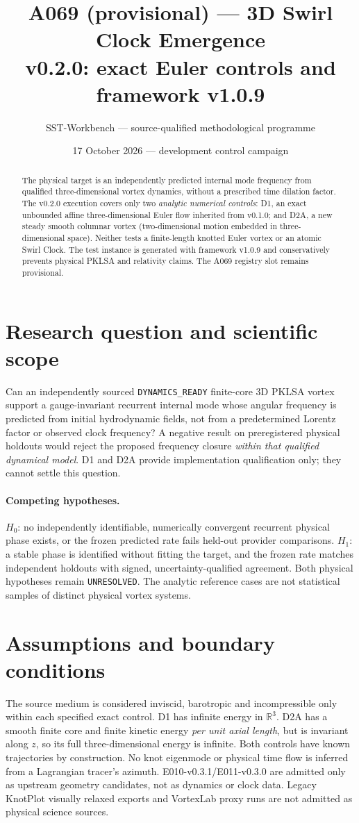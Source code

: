 \documentclass[10pt,a4paper]{article}
\title{A069 (provisional) --- 3D Swirl Clock Emergence\\\large v0.2.0: exact Euler controls and framework v1.0.9}
\author{SST-Workbench --- source-qualified methodological programme}
\date{17 October 2026 --- development control campaign}
\newcommand{\unresolved}{\texttt{UNRESOLVED}}
\begin{document}
\maketitle
\begin{abstract}
The physical target is an independently predicted internal mode frequency from qualified
three-dimensional vortex dynamics, without a prescribed time dilation factor.
The v0.2.0 execution covers only two \emph{analytic numerical controls}: D1, an exact
unbounded affine three-dimensional Euler flow inherited from v0.1.0; and D2A,
a new steady smooth columnar vortex (two-dimensional motion embedded in three-dimensional
space). Neither tests a finite-length knotted Euler vortex or an atomic Swirl Clock.
The test instance is generated with framework v1.0.9 and conservatively prevents
physical PKLSA and relativity claims. The A069 registry slot remains provisional.
\end{abstract}
\section{Research question and scientific scope}
Can an independently sourced \texttt{DYNAMICS\_READY} finite-core 3D PKLSA vortex
support a gauge-invariant recurrent internal mode whose angular frequency is predicted
from initial hydrodynamic fields, not from a predetermined Lorentz factor or observed
clock frequency? A negative result on preregistered physical holdouts would reject
the proposed frequency closure \emph{within that qualified dynamical model}. D1 and D2A
provide implementation qualification only; they cannot settle this question.
\paragraph{Competing hypotheses.}
$H_0$: no independently identifiable, numerically convergent recurrent physical
phase exists, or the frozen predicted rate fails held-out provider comparisons.
$H_1$: a stable phase is identified without fitting the target, and the frozen
rate matches independent holdouts with signed, uncertainty-qualified agreement.
Both physical hypotheses remain \unresolved. The analytic reference cases are
not statistical samples of distinct physical vortex systems.
\section{Assumptions and boundary conditions}
The source medium is considered inviscid, barotropic and incompressible only
within each specified exact control. D1 has infinite energy in $\mathbb R^3$.
D2A has a smooth finite core and finite kinetic energy \emph{per unit axial length},
but is invariant along $z$, so its full three-dimensional energy is infinite.
Both controls have known trajectories by construction. No knot eigenmode or
physical time flow is inferred from a Lagrangian tracer's azimuth.
E010-v0.3.1/E011-v0.3.0 are admitted only as upstream geometry candidates,
not as dynamics or clock data. Legacy KnotPlot visually relaxed exports and
VortexLab proxy runs are not admitted as physical science sources.
\end{document}
